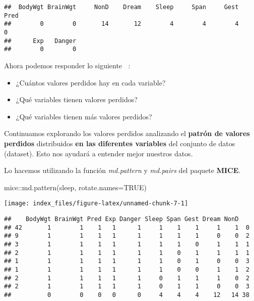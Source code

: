 \documentclass[
]{article}
\newenvironment{Shaded}{\begin{snugshade}}{\end{snugshade}}
\newcommand{\AttributeTok}[1]{\textcolor[rgb]{0.77,0.63,0.00}{#1}}
\newcommand{\ConstantTok}[1]{\textcolor[rgb]{0.00,0.00,0.00}{#1}}
\newcommand{\FunctionTok}[1]{\textcolor[rgb]{0.00,0.00,0.00}{#1}}
\newcommand{\NormalTok}[1]{#1}
\newcommand{\SpecialCharTok}[1]{\textcolor[rgb]{0.00,0.00,0.00}{#1}}
\providecommand{\tightlist}{%
  \setlength{\itemsep}{0pt}\setlength{\parskip}{0pt}}
\begin{document}
\begin{verbatim}
##  BodyWgt BrainWgt     NonD    Dream    Sleep     Span     Gest     Pred 
##        0        0       14       12        4        4        4        0 
##      Exp   Danger 
##        0        0
\end{verbatim}

Ahora podemos responder lo siguiente 👩‍🏫:

\begin{itemize}
\tightlist
\item
  ¿Cuántos valores perdidos hay en cada variable?
\item
  ¿Qué variables tienen valores perdidos?
\item
  ¿Qué variables tienen más valores perdidos? 🙋
\end{itemize}

Continuamos explorando los valores perdidos analizando el \textbf{patrón
de valores perdidos} distribuidos \textbf{en las diferentes variables}
del conjunto de datos (dataset). Esto nos ayudará a entender mejor
nuestros datos.

Lo hacemos utilizando la función \emph{md.pattern} y \emph{md.pairs} del
paquete \textbf{MICE}.

\begin{Shaded}
\begin{Highlighting}[]
\NormalTok{mice}\SpecialCharTok{::}\FunctionTok{md.pattern}\NormalTok{(sleep, }\AttributeTok{rotate.names=}\ConstantTok{TRUE}\NormalTok{)}
\end{Highlighting}
\end{Shaded}

\texttt{[image: index\_files/figure-latex/unnamed-chunk-7-1]}

\begin{verbatim}
##    BodyWgt BrainWgt Pred Exp Danger Sleep Span Gest Dream NonD   
## 42       1        1    1   1      1     1    1    1     1    1  0
## 9        1        1    1   1      1     1    1    1     0    0  2
## 3        1        1    1   1      1     1    1    0     1    1  1
## 2        1        1    1   1      1     1    0    1     1    1  1
## 1        1        1    1   1      1     1    0    1     0    0  3
## 1        1        1    1   1      1     1    0    0     1    1  2
## 2        1        1    1   1      1     0    1    1     1    0  2
## 2        1        1    1   1      1     0    1    1     0    0  3
##          0        0    0   0      0     4    4    4    12   14 38
\end{verbatim}
\end{document}
